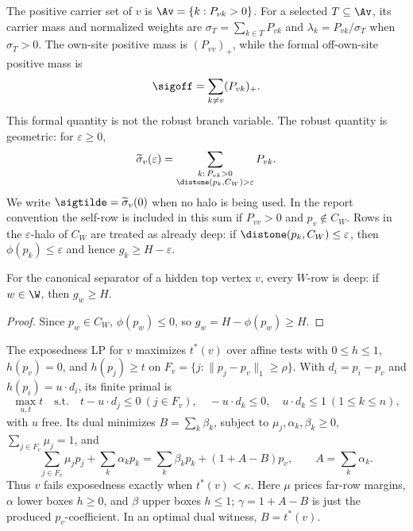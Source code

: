 The positive carrier set of \(v\) is \(\Av=\{k:P_{vk}>0\}\).  For a
selected \(T\subseteq\Av\), its carrier mass and normalized weights are
\(\sigma_T=\sum_{k\in T}P_{vk}\) and
\(\lambda_k=P_{vk}/\sigma_T\) when \(\sigma_T>0\).  The own-site positive
mass is \((P_{vv})_+\), while the formal off-own-site positive mass is
\[
        \sigoff=\sum_{k\ne v}(P_{vk})_+ .
\]
This formal quantity is not the robust branch variable.  The robust
quantity is geometric: for \(\varepsilon\ge0\),
\[
        \widetilde\sigma_v(\varepsilon)
        =\sum_{\substack{k:\,P_{vk}>0\\ \distone(p_k,C_W)>\varepsilon}} P_{vk}.
\]
We write \(\sigtilde=\widetilde\sigma_v(0)\) when no halo is being used.
In the report convention the self-row is included in this sum if
\(P_{vv}>0\) and \(p_v\notin C_W\).  Rows in the
\(\varepsilon\)-halo of \(C_W\) are treated as already deep: if
\(\distone(p_k,C_W)\le\varepsilon\), then
\(\phi(p_k)\le\varepsilon\) and hence \(g_k\ge H-\varepsilon\).

\medskip
\noindent{}

\begin{lemma}
\provedbadge\label{lem:W-rows-deep}
For the canonical separator of a hidden top vertex \(v\), every
\(W\)-row is deep: if \(w\in\W\), then \(g_w\ge H\).
\end{lemma}

\begin{proof}
Since \(p_w\in C_W\), \(\phi(p_w)\le0\), so \(g_w=H-\phi(p_w)\ge H\).
\end{proof}

The exposedness LP for \(v\) maximizes \(t^*(v)\) over affine tests with
\(0\le h\le1\), \(h(p_v)=0\), and \(h(p_j)\ge t\) on
\(F_v=\{j:\|p_j-p_v\|_1\ge\rho\}\).  With \(d_i=p_i-p_v\) and
\(h(p_i)=u\cdot d_i\), its finite primal is
\[
        \max_{u,t} t\quad\text{s.t.}\quad
        t-u\cdot d_j\le0\ (j\in F_v),\quad
        -u\cdot d_k\le0,\quad u\cdot d_k\le1\ (1\le k\le n),
\]
with \(u\) free.  Its dual minimizes \(B=\sum_k\beta_k\), subject to
\(\mu_j,\alpha_k,\beta_k\ge0\), \(\sum_{j\in F_v}\mu_j=1\), and
\[
        \sum_{j\in F_v}\mu_jp_j+\sum_k\alpha_kp_k
        =\sum_k\beta_kp_k+(1+A-B)p_v,\qquad A=\sum_k\alpha_k .
\]
Thus \(v\) fails exposedness exactly when \(t^*(v)<\kappa\).  Here
\(\mu\) prices far-row margins, \(\alpha\) lower boxes \(h\ge0\), and
\(\beta\) upper boxes \(h\le1\); \(\gamma=1+A-B\) is just the produced
\(p_v\)-coefficient.  In an optimal dual witness, \(B=t^*(v)\).


